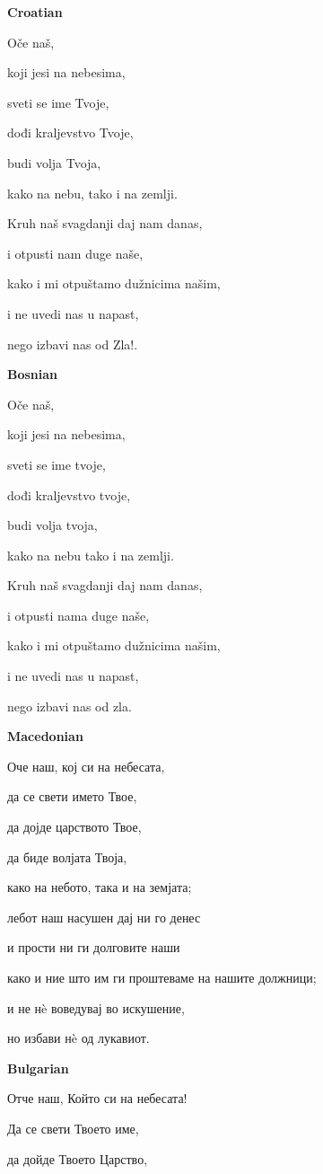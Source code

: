 \textbf{Croatian}

Oče naš,

koji jesi na nebesima, 

sveti se ime Tvoje, 

dođi kraljevstvo Tvoje, 

budi volja Tvoja, 

kako na nebu, tako i na zemlji.

Kruh naš svagdanji daj nam danas, 

i otpusti nam duge naše, 

kako i mi otpuštamo dužnicima našim, 

i ne uvedi nas u napast, 

nego izbavi nas od Zla!. 

\textbf{Bosnian}

Oče naš,

koji jesi na nebesima,

sveti se ime tvoje,

dođi kraljevstvo tvoje,

budi volja tvoja,

kako na nebu tako i na zemlji.

Kruh naš svagdanji daj nam danas,

i otpusti nama duge naše,

kako i mi otpuštamo dužnicima našim,

i ne uvedi nas u napast,

nego izbavi nas od zla.

\textbf{Macedonian}

Оче наш, кој си на небесата,

да се свети името Твое,

да дојде царството Твое,

да биде волјата Твоја,

како на небото, така и на земјата;

лебот наш насушен дај ни го денес

и прости ни ги долговите наши

како и ние што им ги проштеваме на нашите должници;

и не нè воведувај во искушение,

но избави нè од лукавиот.

\textbf{Bulgarian}

Отче наш, Който си на небесата!

Да се свети Твоето име,

да дойде Твоето Царство,

